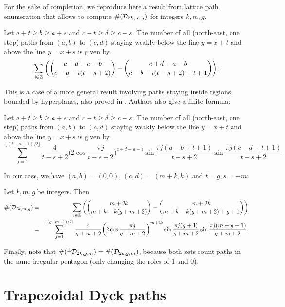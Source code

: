 For the sake of completion, we reproduce here a result from lattice path enumeration that allows to compute $\#(\mathcal{D}_{2k,m,g})$ for integers $k,m,g$.
\begin{mythm}
Let $a+t\geq b\geq a+s$ and $c+t\geq d\geq c+s$. The number of all (north-east, one step) paths from $(a,b)$ to $(c,d)$ staying weakly below the line $y=x+t$ and above the line $y=x+s$ is given by
$$\sum_{i\in\mathbb{Z}}\bigg({c+d-a-b\choose c-a-i(t-s+2)}-{c+d-a-b\choose c-b-i(t-s+2)+t+1}\bigg).$$
\end{mythm}
This is a case of a more general result involving paths staying inside regions bounded by hyperplanes, also proved in . Authors also give a finite formula:
\begin{mythm}
	Let $a+t\geq b\geq a+s$ and $c+t\geq d\geq c+s$. The number of all (north-east, one step) paths from $(a,b)$ to $(c,d)$ staying weakly below the line $y=x+t$ and above the line $y=x+s$ is given by
	$$\sum_{j=1}^{\lfloor(t-s+1)/2\rfloor}\frac{4}{t-s+2}\bigg(2\cos\frac{\pi j}{t-s+2}\bigg)^{c+d-a-b}\sin\frac{\pi j(a-b+t+1)}{t-s+2}\sin\frac{\pi j(c-d+t+1)}{t-s+2}$$
\end{mythm}
 In our case, we have $(a,b)=(0,0)$, $(c,d)=(m+k,k)$ and $t=g,s=-m$:

\begin{myprop} Let $k,m,g$ be integers. Then
	\begin{eqnarray*}
\#(\mathcal{D}_{2k,m,g})&=& \sum_{i\in\mathbb{Z}}\bigg({m+2k\choose m+k-k(g+m+2)}-{m+2k\choose m+k-k(g+m+2)+g+1}\bigg)\\
				  &=& \sum_{j=1}^{\lfloor(g+m+1)/2\rfloor}\frac{4}{g+m+2}\bigg(2\cos\frac{\pi j}{g+m+2}\bigg)^{m+2k}\sin\frac{\pi j(g+1)}{g+m+2}\sin\frac{\pi j(m+g+1)}{g+m+2}.
	\end{eqnarray*}
\end{myprop}
Finally, note that $\#({}^\perp \mathcal{D}_{2k,g,m})=\#(\mathcal{D}_{2k,g,m})$, because both sets count paths in the same irregular pentagon (only changing the roles of 1 and 0).


 
 
 
 
 
 
 
 
 
 
 
 
 
 
 
 \section{Trapezoidal Dyck paths}
 \label{appendix-trapezoid}
 
